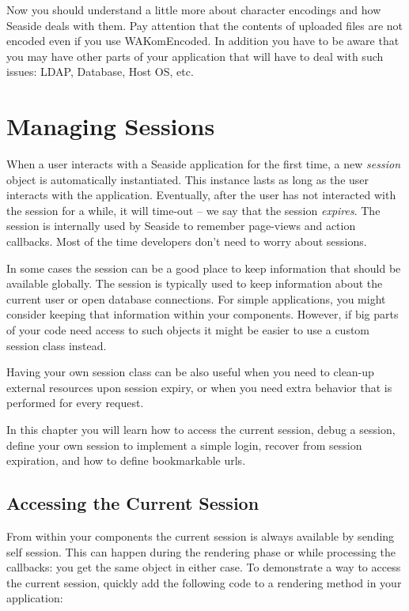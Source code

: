 \documentclass[a4paper,10pt,twoside]{book}
\newcommand{\ct}[1]{{\small\ttfamily\textup{#1}}}
\begin{document}
Now you should understand a little more about character encodings and how Seaside deals with them. Pay attention that the contents of uploaded files are not encoded even if you use WAKomEncoded. In addition you have to be aware that you may have other parts of your application that will have to deal with such issues: LDAP, Database, Host OS, etc.

\chapter{Managing Sessions}
\label{book:inaction:session}

When a user interacts with a Seaside application for the first time, a new \textit{session} object is automatically instantiated. This instance lasts as long as the user interacts with the application. Eventually, after the user has not interacted with the session for a while, it will time-out -- we say that the session \textit{expires}. The session is internally used by Seaside to remember page-views and action callbacks. Most of the time developers don't need to worry about sessions.

In some cases the session can be a good place to keep information that should be available globally. The session is typically used to keep information about the current user or open database connections. For simple applications, you might consider keeping that information within your components. However, if big parts of your code need access to such objects it might be easier to use a custom session class instead.

Having your own session class can be also useful when you need to clean-up external resources upon session expiry, or when you need extra behavior that is performed for every request.

In this chapter you will learn how to access the current session, debug a session, define your own session to implement a simple login, recover from session expiration, and how to define bookmarkable urls.

\section{Accessing the Current Session}
\label{book:inaction:session:currentsession}


From within your components the current session is always available by sending \ct{self session}. This can happen during the rendering phase or while processing the callbacks: you get the same object in either case. To demonstrate a way to access the current session, quickly add the following code to a rendering method in your application:
\end{document}
